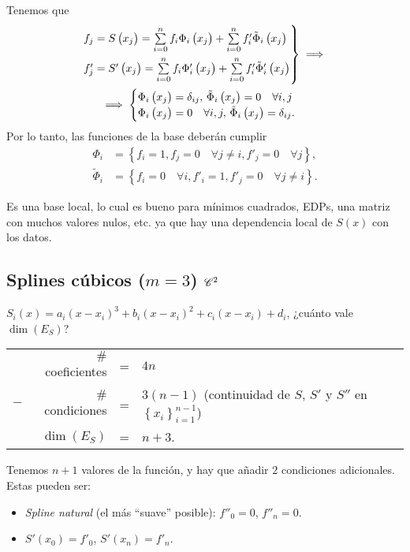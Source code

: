 Tenemos que
\begin{gather*}
    \begin{rcases}
        f_j = S\left( x_j \right) = \sum\limits_{i=0}^n f_i\Phi_i\left( x_j \right) + \sum\limits_{i=0}^n f'_i\tilde{\Phi}_i\left( x_j \right) \\
        f'_j = S'\left( x_j \right) = \sum\limits_{i=0}^n f_i\Phi'_i\left( x_j \right) + \sum\limits_{i=0}^n f'_i\tilde{\Phi}'_i\left( x_j \right)
    \end{rcases}
    \implies \\
    \implies
    \begin{cases}
        \Phi_i \left( x_j \right) = \delta_{ij},\, \tilde{\Phi}_i\left( x_j \right) = 0\quad \forall i,j\\
        \Phi_i \left( x_j \right) = 0\quad \forall i,j,\, \tilde{\Phi}_i\left( x_j \right) = \delta_{ij}.
    \end{cases}
\end{gather*}
Por lo tanto, las funciones de la base deberán cumplir
\begin{align*}
    \Phi_i &= \left\{ f_i = 1, f_j=0\quad \forall j\neq i, f'_j = 0 \quad\forall j \right\}, \\
    \tilde{\Phi}_i &= \left\{ f_i = 0\quad \forall i, f'_i = 1, f'_j = 0 \quad\forall j\neq i \right\}.
\end{align*}

\begin{obs}
    Es una base local, lo cual es bueno para mínimos cuadrados, EDPs, una matriz con muchos valores nulos, etc. ya que hay una dependencia local de $S\left( x \right)$ con los datos.
\end{obs}

\subsection{Splines cúbicos ($m=3$) $\mathscr{C}^2$}

$S_i\left( x \right) = a_i\left( x-x_i \right)^3 + b_i\left( x-x_i \right)^2 + c_i\left( x-x_i \right) + d_i$, ¿cuánto vale $\dim\left( E_S \right)$?

\begin{center}
    \begin{tabular}{crcl}
        & $\#$coeficientes &=& $4n$\\
        $-$ & $\#$condiciones &=& $3\left( n-1\right)$ (continuidad de $S$, $S'$ y $S''$ en $\left\{ x_i \right\}_{i=1}^{n-1}$)\\\hline
        &$\dim\left( E_S \right)$ &=& $n+3$.
    \end{tabular}
\end{center}

Tenemos $n+1$ valores de la función, y hay que añadir $2$ condiciones adicionales. Estas pueden ser:

\begin{itemize}
    \item \emph{Spline natural} (el más ``suave'' posible): $f''_0 = 0$, $f''_n = 0$.
    \item $S'\left( x_0 \right) = f'_0$, $S'\left( x_n \right) = f'_n$.
\end{itemize}
